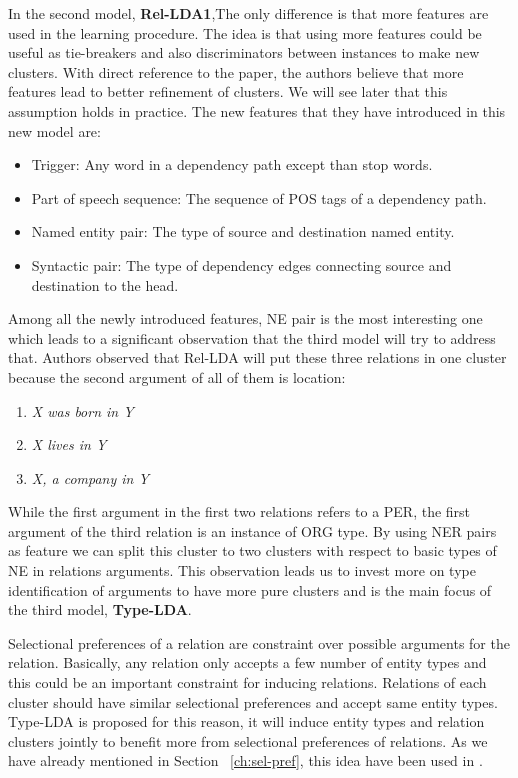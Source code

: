    	In the second model, \textbf{Rel-LDA1},The only difference is that  more features are used in the learning procedure.
   	 The idea is that using more features could be useful as tie-breakers and also discriminators between instances
   	  to make new clusters. With direct reference to the paper, the authors believe that more features 
   	  lead to better refinement of clusters. We will see later that this assumption holds in practice.
   	   The new features that they have introduced in this new model are:
   	   \begin{itemize}
   	     \item Trigger: Any word in a dependency path except than stop words. 
   	     \item Part of speech sequence: The sequence of POS tags of a dependency path. 
   	     \item Named entity pair: The type of source and destination named entity.
   	     \item Syntactic pair: The type of dependency edges connecting source and destination to the head.
   	   \end{itemize}   
   
 Among all the newly introduced features, NE pair is the most interesting one which leads to a 
 significant observation that the third model will try to address that. Authors observed that 
 Rel-LDA will put these three relations in one cluster because the second argument of all of them is location:
 
 \begin{enumerate}
   \item \emph{ X was born in Y}
   \item \emph{ X lives in Y}
   \item \emph{ X, a company in Y}
 \end{enumerate}
 
 While the first argument in the first two relations refers to a PER, the first argument of the 
 third relation is an instance of ORG type. By using NER pairs as feature we can split this cluster 
 to two clusters with respect to basic types of NE in relations arguments. 
 This observation leads us to invest more on type identification of arguments to have more pure 
 clusters and is the main focus of the third model, \textbf{Type-LDA}.
 
 
 Selectional preferences of a relation are constraint over possible arguments for the relation.
  Basically, any relation only accepts a few number of entity types and this could be an important constraint
   for inducing relations. Relations of each cluster should have similar selectional preferences and
    accept same entity types. Type-LDA is proposed for this reason, it will induce entity types 
    and relation clusters jointly to benefit more from selectional preferences of relations. 
    As we have already mentioned in Section ~\ref{ch:sel-pref},
     this idea have been used in \cite{Pantel2007} .
    
